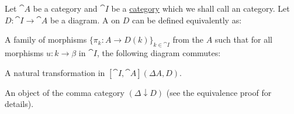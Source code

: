 \begin{definition}\label{def:categorical_cone}\mcite\cite[def. 5.1.19(a)]{Leinster2016Basic}
  Let \( \cat{A} \) be a category and \( \cat{I} \) be a \hyperref[def:categorical_diagram]{category} which we shall call an  category. Let \( D: \cat{I} \to \cat{A} \) be a diagram. A  on \( D \) can be defined equivalently as:

  \begin{thmenum}
     A family of  morphisms \( \{ \pi_k: A \to D(k) \}_{k \in \cat{I}} \) from the  \( A \) such that for all morphisms \( u: k \to \beta \) in \( \cat{I} \), the following diagram commutes:
    \begin{alignedeq}\label{def:categorical_cone/universal_property}
      \iffalse\begin{mplibcode}
        beginfig(1);
        input metapost/graphs;

        v1 := thelabel("$A$", origin);
        v2 := thelabel("$D(k)$", (-1, -1) scaled u);
        v3 := thelabel("$D(\beta)$", (1, -1) scaled u);

        a1 := straight_arc(v1, v2);
        a2 := straight_arc(v1, v3);
        a3 := straight_arc(v2, v3);

        draw_vertices(v);
        draw_arcs(a);

        label.ulft("$\pi_k$", straight_arc_midpoint of a1);
        label.urt("$\pi_\beta$", straight_arc_midpoint of a2);
        label.bot("$D(u)$", straight_arc_midpoint of a3);
        endfig;
      \end{mplibcode}\fi
    \end{alignedeq}

     A natural transformation in \( [\cat{I}, \cat{A}](\Delta A, D) \).

     An object of the comma category \( (\Delta \downarrow D) \) (see the equivalence proof for details).
  \end{thmenum}
\end{definition}
